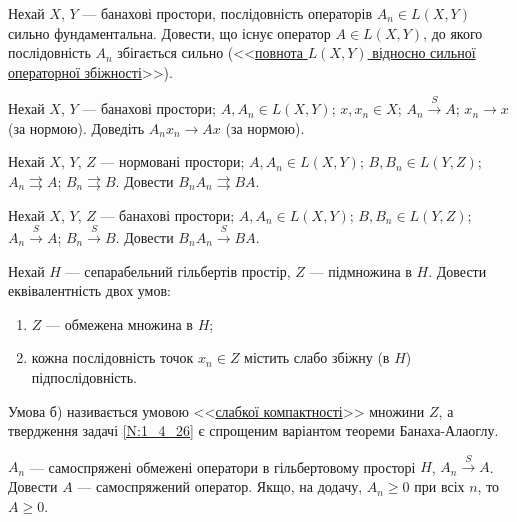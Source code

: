 \begin{exercise}
    Нехай $X$, $Y$ --- банахові простори, послідовність операторів $A_n \in L(X,Y)$ сильно
    фундаментальна. Довести, що існує оператор $A \in L(X,Y)$, до якого послідовність $A_n$
    збігається сильно (<<\ul{повнота $L(X,Y)$ відносно сильної операторної збіжності}>>).
\end{exercise}

\begin{exercise}
    Нехай $X$, $Y$ --- банахові простори; $A, A_n \in L(X,Y)$; $x, x_n \in X$;
    $A_n \overset{S}{\to} A$; $x_n \to x$ (за нормою). Доведіть $A_n x_n \to Ax$ (за нормою).
\end{exercise}

\begin{exercise}
    Нехай $X$, $Y$, $Z$ --- нормовані простори; $A, A_n \in L(X,Y)$; $B, B_n \in L(Y,Z)$;
    $A_n \rightrightarrows A$; $B_n \rightrightarrows B$.
    Довести $B_n A_n \rightrightarrows BA$.
\end{exercise}

\begin{exercise}
    Нехай $X$, $Y$, $Z$ --- банахові простори; $A, A_n \in L(X,Y)$; $B, B_n \in L(Y,Z)$;
    $A_n \overset{S}{\to} A$; $B_n \overset{S}{\to} B$.
    Довести $B_n A_n \overset{S}{\to} BA$.
\end{exercise}

\begin{exercise}\label{N:1_4_26}
    Нехай $H$ --- сепарабельний гільбертів простір, $Z$ --- підмножина в $H$.
    Довести еквівалентність двох умов:
    \begin{enumerate}
        \item $Z$ --- обмежена множина в $H$;
        \item кожна послідовність точок $x_n \in Z$ містить слабо збіжну (в $H$) 
        підпослідовність.
    \end{enumerate}
\end{exercise}

\begin{theory}
    Умова б) називається умовою <<\uline{слабкої компактності}>> множини $Z$,
    а твердження задачі \ref{N:1_4_26} є спрощеним варіантом теореми Банаха-Алаоглу.
\end{theory}

\begin{exercise}
    $A_n$ --- самоспряжені обмежені оператори в гільбертовому просторі $H$,
    $A_n \overset{S}{\to} A$. Довести $A$ --- самоспряжений оператор.
    Якщо, на додачу, $A_n \geq 0$ при всіх $n$, то $A \geq 0$.
\end{exercise}

